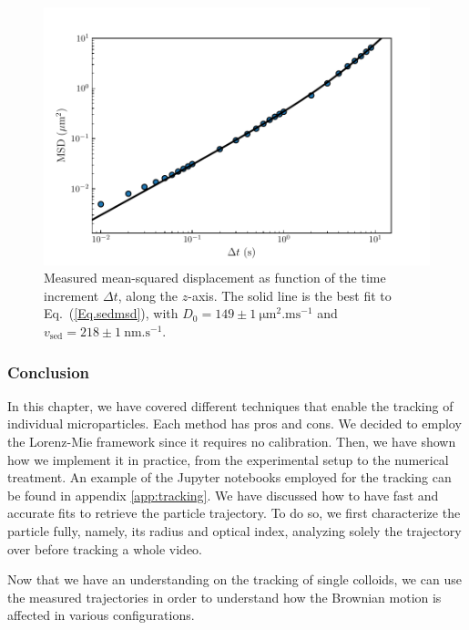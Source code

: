 \begin{figure}[H]
	\centering
	\includegraphics{02_body/chapter2/images/sedimenting/msd_sedimentation.pdf}
	\caption{Measured mean-squared displacement as function of the time increment $\Delta t$, along the $z$-axis. The solid line is the best fit to Eq.~(\ref{Eq.sedmsd}), with $D_0 = 149 \pm 1 ~ \mathrm{\mu m ^2 . ms^{-1}}$ and $v_\mathrm{sed} = 218 \pm 1 ~ \mathrm{nm.s^{-1}}$.}
	\label{fig:msdsed}
\end{figure}



\subsubsection{Conclusion}

In this chapter, we have covered different techniques that enable the tracking of individual microparticles. Each method has pros and cons. We decided to employ the Lorenz-Mie framework since it requires no calibration. Then, we have shown how we implement it in practice, from the experimental setup to the numerical treatment. An example of the Jupyter notebooks employed for the tracking can be found in appendix \ref{app:tracking}.  We have discussed how to have fast and accurate fits to retrieve the particle trajectory. To do so, we first characterize the particle fully, namely, its radius and optical index, analyzing solely the trajectory over before tracking a whole video. 

Now that we have an understanding on the tracking of single colloids, we can use the measured trajectories in order to understand how the Brownian motion is affected in various configurations. 

